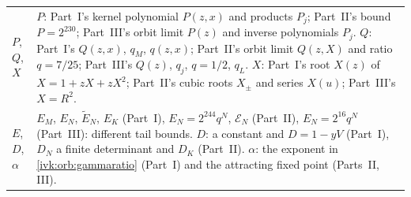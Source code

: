 \documentclass[11pt,letterpaper]{article}
\theoremstyle{remark}\newtheorem{remark}[theorem]{Remark}
\begin{document}
\begin{longtable}{@{}>{\raggedright\arraybackslash}p{} >{\raggedright\arraybackslash}p{}@{}}
$P$, $Q$, $X$ & $P$: Part~I's kernel polynomial $P(z,x)$ and products $P_j$; Part~II's bound $P=2^{230}$; Part~III's orbit limit $P(z)$ and inverse polynomials $P_j$. $Q$: Part~I's $Q(z,x)$, $q_M$, $q(z,x)$; Part~II's orbit limit $Q(z,X)$ and ratio $q=7/25$; Part~III's $Q(z)$, $q_j$, $q=1/2$, $q_L$. $X$: Part~I's root $X(z)$ of $X=1+zX+zX^2$; Part~II's cubic roots $X_\pm$ and series $X(u)$; Part~III's $X=R^2$.\\
$E$, $D$, $\alpha$ & $E_M$, $E_N$, $\widetilde E_N$, $E_K$ (Part~I), $E_N=2^{244}q^N$, $\mathcal E_N$ (Part~II), $E_N=2^{16}q^N$ (Part~III): different tail bounds. $D$: a constant and $D=1-yV$ (Part~I), $D_N$ a finite determinant and $D_K$ (Part~II). $\alpha$: the exponent in \eqref{ivk:orb:gammaratio} (Part~I) and the attracting fixed point (Parts~II, III).\\
\bottomrule
\end{longtable}
\addtocounter{table}{-1}%
\endgroup
\end{document}
